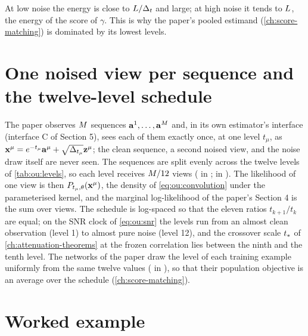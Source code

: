 At low noise the energy is close to $L/\Delta_t$ and large; at high noise it tends to
$L$, the energy of the score of $\gamma$. This is why the paper's pooled
estimand (\cref{ch:score-matching}) is dominated by its lowest levels.

\section{One noised view per sequence and the twelve-level schedule}
\label{sec:ou:protocol}

The paper observes $M$ sequences $\mathbf{a}^{1},\dots,\mathbf{a}^{M}$ and, in its own
estimator's interface (interface C of Section 5), sees each of them exactly once, at one
level $t_\mu$, as $\mathbf{x}^{\mu}=e^{-t_\mu}\mathbf{a}^{\mu}+\sqrt{\Delta_{t_\mu}}\mathbf{z}^{\mu}$; the clean
sequence, a second noised view, and the noise draw itself are never seen. The
sequences are split evenly across the twelve levels of \cref{tab:ou:levels}, so each
level receives $M/12$ views ( in
;  in
). The likelihood of one view is then
$P_{t_\mu,\theta}(\mathbf{x}^{\mu})$, the density of \cref{eq:ou:convolution} under the
parameterised kernel, and the marginal log-likelihood of the paper's Section 4 is the
sum over views. The schedule is log-spaced so that the eleven ratios $t_{k+1}/t_k$ are
equal; on the SNR clock of \cref{eq:ou:snr} the levels run from an almost clean
observation (level 1) to almost pure noise (level 12), and the crossover scale
$t_{*}$ of \cref{ch:attenuation-theorems} at the frozen correlation lies between the
ninth and the tenth level. The networks of the paper draw the level of each training
example uniformly from the same twelve values ( in
), so that their population objective is an
average over the schedule (\cref{ch:score-matching}).

\section{Worked example}
\label{sec:ou:example}

